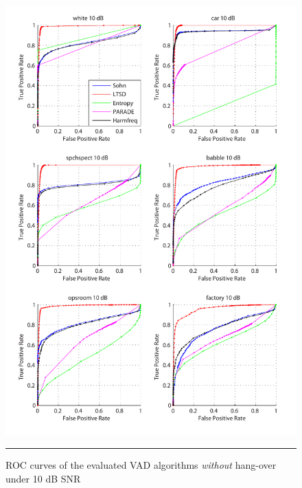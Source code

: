 \begin{figure}[htbp]
	\centering
		\includegraphics[width=1.0\columnwidth]{Figures/AppendixA/10dBnoh.pdf}
		\rule{37em}{0.5pt}
	\caption[ROC curves of the evaluated algorithms \emph{without} hang-over under 10 dB SNR]{ROC curves of the evaluated VAD algorithms \emph{without} hang-over under 10 dB SNR}
	\label{fig:10dBnoh}
\end{figure}

